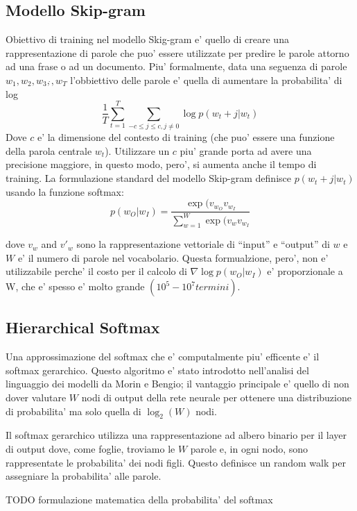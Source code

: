 \documentclass[a4paper,11pt]{book}
\theoremstyle{definition}
\begin{document}
\subsection{Modello Skip-gram}
Obiettivo di training nel modello Skig-gram e' quello di creare una rappresentazione di parole che
puo' essere utilizzate per predire le parole attorno ad una frase o ad un documento. Piu' formalmente,
data una seguenza di parole $w_1,w_2,w_3,\dot{},w_T$ l'obbiettivo delle parole e' quella di aumentare la
probabilita' di log
\begin{equation}
	\frac{1}{T} \sum_{t=1}^{T} \sum_{-c\leq j\leq c,j\neq0} \log p(w_t+j|w_t)
	\label{eq:prob log}
\end{equation}
Dove $c$ e' la dimensione del contesto di training (che puo' essere una funzione della parola centrale $w_t$).
Utilizzare un $c$ piu' grande porta ad avere una precisione maggiore, in questo modo, pero', si aumenta anche il 
tempo di training. La formulazione standard del modello Skip-gram definisce $p(w_t+j|w_t)$ usando la funzione
softmax:
\begin{equation}
	p(w_O|w_I) = \frac{\exp(v_{w_O} v_{w_I}}{\sum_{w=1}^{W}\exp(v_w v_{w_I}}
	\label{eq:softmax}
\end{equation}

dove $v_w$ and $v'_w$ sono la rappresentazione vettoriale di ``input'' e ``output'' di $w$ e $W$ e' il numero
di parole nel vocabolario.
Questa formualzione, pero', non e' utilizzabile perche' il costo per il calcolo di $\nabla\log p(w_O|w_I)$
e' proporzionale a W, che e' spesso e' molto grande $(10^5-10^7 termini)$.

\subsection{Hierarchical Softmax}
Una approssimazione del softmax che e' computalmente piu' efficente e' il softmax gerarchico. Questo algoritmo
e' stato introdotto nell'analisi del linguaggio dei modelli da Morin e Bengio; il vantaggio principale
e' quello di non dover valutare $W$ nodi di output della rete neurale per ottenere una distribuzione
di probabilita' ma solo quella di $\log_2(W)$ nodi.

Il softmax gerarchico utilizza una rappresentazione ad albero binario per il layer di output dove, come foglie,
troviamo le $W$ parole e, in ogni nodo, sono rappresentate le probabilita' dei nodi figli.
Questo definisce un random walk per assegniare la probabilita' alle parole.

TODO formulazione matematica della probabilita' del softmax
\end{document}

